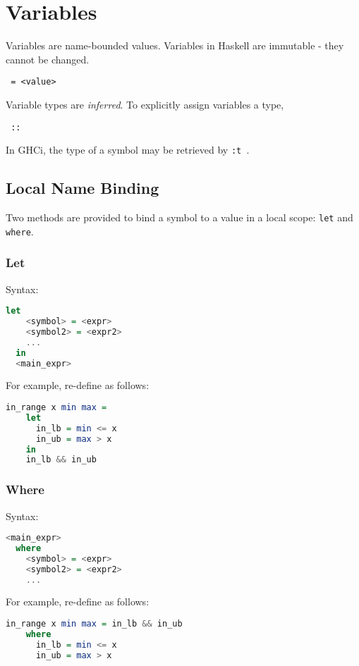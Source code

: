 \section{Variables}

Variables are name-bounded values. Variables in Haskell are immutable - they cannot be changed.

\begin{center}
  \texttt{ = <value>}
\end{center}

Variable types are \textit{inferred}. To explicitly assign variables a type,

\begin{center}
  \texttt{ :: }
\end{center}

In GHCi, the type of a symbol may be retrieved by \texttt{:t }.

\subsection{Local Name Binding}
Two methods are provided to bind a symbol to a value in a local scope: \texttt{let} and \texttt{where}.

\subsubsection{Let}
Syntax:
\begin{lstlisting}[language=haskell]
  let
    <symbol> = <expr>
    <symbol2> = <expr2>
    ...
  in
  <main_expr>
\end{lstlisting}

For example, re-define \texttt{} as follows:

\begin{lstlisting}[language=haskell]
  in_range x min max =
    let
      in_lb = min <= x
      in_ub = max > x
    in
    in_lb && in_ub
\end{lstlisting}

\subsubsection{Where}
Syntax:

\begin{lstlisting}[language=haskell]
  <main_expr>
  where
    <symbol> = <expr>
    <symbol2> = <expr2>
    ...
\end{lstlisting}

For example, re-define \texttt{} as follows:

\begin{lstlisting}[language=haskell]
  in_range x min max = in_lb && in_ub
    where
      in_lb = min <= x
      in_ub = max > x
\end{lstlisting}